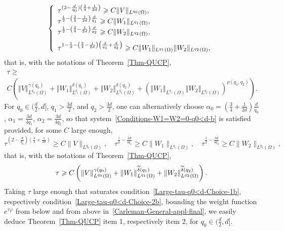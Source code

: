 \documentclass[10pt]{amsart}
\theoremstyle{definition}\newtheorem{defi}[theo]{Definition}\newtheorem{rema}[theo]{Remark}\newtheorem{exam}[theo]{Example}\newtheorem{exem}[theo]{Example}\newtheorem{nota}[theo]{Notation}
\newcommand*\ds{\displaystyle}
\newcommand{\norm}[1]{\left\Vert#1\right\Vert}
\renewcommand{\geq}{\geqslant}
\renewcommand{\tilde}{\widetilde}
\let\oldtilde\tilde
\renewcommand*{\tilde}[1]{\mathchoice{\widetilde{#1}}{\widetilde{#1}}{\oldtilde{#1}}{\oldtilde{#1}}}
\begin{document}
\begin{equation}\label{Large-tau-q0<d-Choice-1}
\left\{
\begin{array}{l}
\ds \tau^{(2 - \frac{d}{q_0}) \left(\frac{3}{4}+\frac{1}{2d}\right)} \geq C \|V \|_{L^{q_0}(\Omega)},\\
\ds
\tau^{\frac{1}{2} - \left(\frac{3}{4} - \frac{1}{2d}\right)\frac{d}{q_1}} \geq C \| W_{1} \|_{L^{q_1}(\Omega)},
\\
\tau^{\frac{1}{2} - \left(\frac{3}{4} - \frac{1}{2d}\right)\frac{d}{q_2}} \geq C \| W_{2} \|_{L^{q_2}(\Omega)},
\medskip
\\
\ds \tau^{1-\frac{1}{d} - \left(\frac{3}{4} - \frac{1}{2d}\right) \left(\frac{d}{q_1} + \frac{d}{q_2}\right) } \geq C \| W_{1} \|_{L^{q_1}(\Omega)} \| W_{2} \|_{L^{q_2}(\Omega)},
\end{array}\right.
\end{equation}
that is, with the notations of Theorem~\ref{Thm-QUCP},
\begin{multline}\label{Large-tau-q0<d-Choice-1b}
\tau \geq\\
C \left(\norm{V}_{L^{q_0}(\Omega)}^{\gamma(q_0)}+\norm{W_1}_{L^{q_1}(\Omega)}^{\delta(q_1)} + \norm{W_2}_{L^{q_2}(\Omega)}^{\delta(q_2)} + \left(\norm{W_1}_{L^{q_1}(\Omega)}\norm{W_2}_{L^{q_2}(\Omega)}\right)^{\rho(q_1,q_2)}
\right).
\end{multline}
For $q_0 \in (\frac{d}{2}, d]$, $q_1 > \frac{3d}{2} $, and $q_2 > \frac{3d}{2} $, one can alternatively choose $\alpha_0 = (\frac{3}{4} + \frac{1}{2d})\frac{d}{q_0}$, $\alpha_1 = \frac{3d}{4q_1}$, $\alpha_2 = \frac{3d}{4q_2}$, so that system~\eqref{Conditions-W1=W2=0-q0<d-b} is satisfied provided, for some $C$ large enough,
\begin{equation*}
\ds
\tau^{\left(2 - \frac{d}{q_0}\right) \left(\frac{3}{4}+\frac{1}{2d}\right)} \geq C \|V \|_{L^{q_0}(\Omega)},
\ds
\quad\tau^{\frac{1}{2} - \frac{3d}{4q_1}} \geq C \| W_{1} \|_{L^{q_1}(\Omega)},
\quad
\tau^{\frac{1}{2} - \frac{3d}{4q_2}} \geq C \| W_{2} \|_{L^{q_2}(\Omega)},
\end{equation*}
that is, with the notations of Theorem~\ref{Thm-QUCP},
\begin{equation}\label{Large-tau-q0<d-Choice-2b}
\tau \geq C \left(\norm{V}_{L^{q_0}(\Omega)}^{\gamma(q_0)}+\norm{W_1}_{L^{q_1}(\Omega)}^{\tilde \delta(q_1)} + \norm{W_2}_{L^{q_2}(\Omega)}^{\tilde \delta(q_2)}\right).
\end{equation}
Taking $\tau$ large enough that saturates condition~\eqref{Large-tau-q0<d-Choice-1b}, respectively condition~\eqref{Large-tau-q0<d-Choice-2b}, bounding the weight function $e^{\tau \varphi}$ from below and from above in~\eqref{Carleman-General-appl-final}, we easily deduce Theorem~\ref{Thm-QUCP} item 1, respectively item 2, for $q_0 \in (\frac{d}{2}, d]$.
\end{document}
